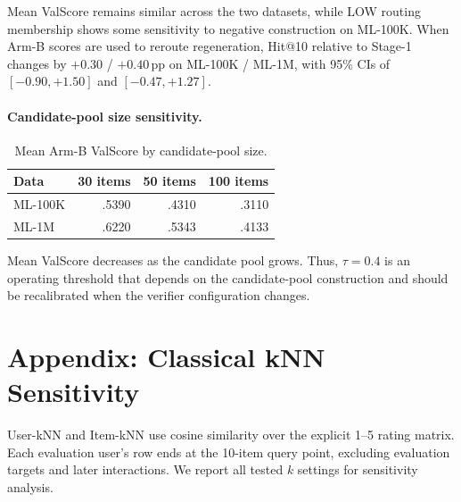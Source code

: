 \documentclass[11pt]{article}
\begin{document}
Mean ValScore remains similar across the two datasets, while LOW routing membership shows some sensitivity to negative construction on ML-100K. When Arm-B scores are used to reroute regeneration, Hit@10 relative to Stage-1 changes by $+0.30$ / $+0.40$\,pp on ML-100K / ML-1M, with 95\% CIs of $[-0.90,+1.50]$ and $[-0.47,+1.27]$.

\paragraph{Candidate-pool size sensitivity.}
\begin{table}[h]
\centering
\small
\setlength{\tabcolsep}{6pt}
\begin{tabular}{lrrr}
\toprule
\textbf{Data} & \textbf{30 items} & \textbf{50 items} & \textbf{100 items} \\
\midrule
ML-100K & .5390 & .4310 & .3110 \\
ML-1M   & .6220 & .5343 & .4133 \\
\bottomrule
\end{tabular}
\caption{Mean Arm-B ValScore by candidate-pool size.}
\label{tab:pool_size}
\end{table}

Mean ValScore decreases as the candidate pool grows. Thus, $\tau=0.4$ is an operating threshold that depends on the candidate-pool construction and should be recalibrated when the verifier configuration changes.

\section{Appendix: Classical kNN Sensitivity}
\label{app:knn}

User-kNN and Item-kNN use cosine similarity over the explicit 1--5 rating matrix. Each evaluation user's row ends at the 10-item query point, excluding evaluation targets and later interactions. We report all tested $k$ settings for sensitivity analysis.
\end{document}
